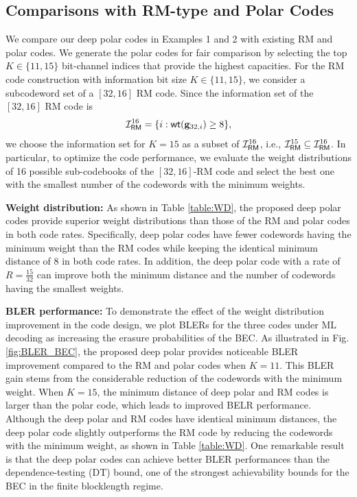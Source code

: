 \documentclass[conference]{IEEEtran}
\begin{document}

\subsection{Comparisons with RM-type and Polar Codes}

We compare our deep polar codes in Examples 1 and 2 with existing RM and polar codes. We generate the polar codes for fair comparison by selecting the top $K\in \{11,15\}$ bit-channel indices that provide the highest capacities. For the RM code construction with information bit size $K\in \{11,15\}$,  we consider a subcodeword set of a $[32,16]$ RM code. Since the information set of the $[32,16]$ RM code is 
\begin{align}
	\mathcal{I}_{\sf RM}^{16} =\{i: {\sf wt}({\bf g}_{32,i})\geq 8\},
\end{align}
we choose the information set for $K=15$ as a subset of $ \mathcal{I}_{\sf RM}^{16}$, i.e., $\mathcal{I}_{\sf RM}^{15}\subseteq \mathcal{I}_{\sf RM}^{16}$. In particular, to optimize the code performance, we evaluate the weight distributions of 16 possible sub-codebooks of the $[32,16]$-RM code and select the best one with the smallest number of the codewords with the minimum weights. 
 

\vspace{0.1cm}
{\bf Weight distribution:}
As shown in Table \ref{table:WD}, the proposed deep polar codes provide superior weight distributions than those of the RM and polar codes in both code rates. Specifically, deep polar codes have fewer codewords having the minimum weight than the RM codes while keeping the identical minimum distance of $8$ in both code rates. In addition, the deep polar code with a rate of $R=\frac{15}{32}$ can improve both the minimum distance and the number of codewords having the smallest weights. 


{\bf BLER performance:}
To demonstrate the effect of the weight distribution improvement in the code design, we plot BLERs for the three codes under ML decoding as increasing the erasure probabilities of the BEC. As illustrated in Fig. \ref{fig:BLER_BEC}, the proposed deep polar provides noticeable BLER improvement compared to the RM and polar codes when $K=11$. This BLER gain stems from the considerable reduction of the codewords with the minimum weight. When $K=15$, the minimum distance of deep polar and RM codes is larger than the polar code, which leads to improved BELR performance. Although the deep polar and RM codes have identical minimum distances, the deep polar code slightly outperforms the RM code by reducing the codewords with the minimum weight, as shown in Table \ref{table:WD}. One remarkable result is that the deep polar codes can achieve better BLER performances than the dependence-testing (DT) bound, one of the strongest achievability bounds for the BEC in the finite blocklength regime. 
\end{document}
